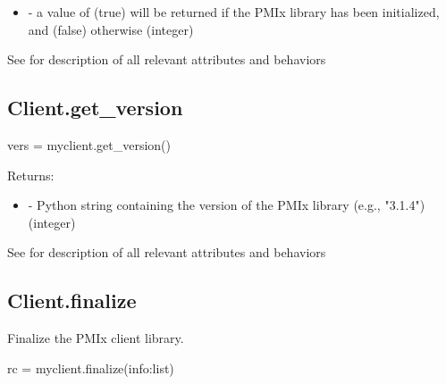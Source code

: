 \begin{itemize}
    \item {} - a value of  (true) will be returned if the \ac{PMIx} library has been initialized, and  (false) otherwise (integer)

\end{itemize}


See  for description of all relevant attributes and behaviors

\subsection{Client.get_version}

\format

\pyspecificstart
\begin{codepar}
vers = myclient.get_version()
\end{codepar}
\pyspecificend



Returns:

\begin{itemize}
    \item {} - Python string containing the version of the \ac{PMIx} library (e.g., "3.1.4") (integer)

\end{itemize}


See  for description of all relevant attributes and behaviors

\subsection{Client.finalize}

\summary

Finalize the PMIx client library.

\format

\pyspecificstart
\begin{codepar}
rc = myclient.finalize(info:list)
\end{codepar}
\pyspecificend

\begin{arglist}
\end{arglist}

